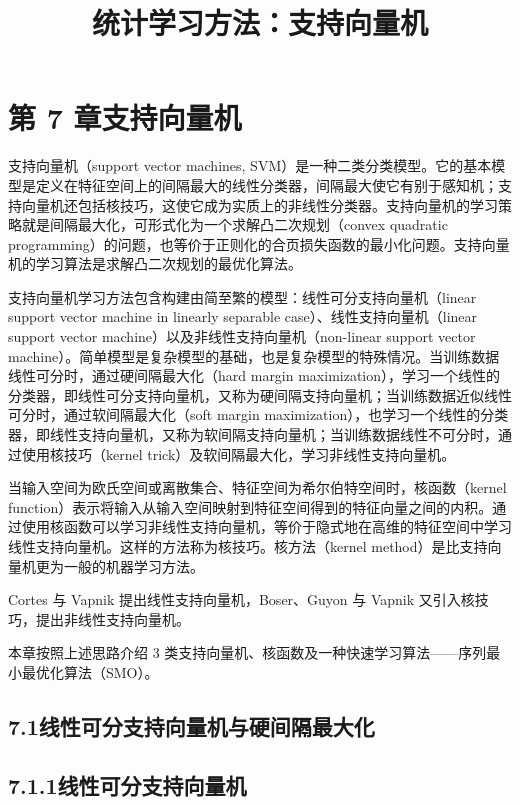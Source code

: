 \documentclass[UTF8, 12pt, fontset=fandol, oneside]{ctexart}
\title{统计学习方法：支持向量机}
\author{}
\date{}
\begin{document}
\maketitle

\section*{第 7 章\quad 支持向量机}

支持向量机（support vector machines, SVM）是一种二类分类模型。它的基本模型是定义在特征空间上的间隔最大的线性分类器，间隔最大使它有别于感知机；支持向量机还包括核技巧，这使它成为实质上的非线性分类器。支持向量机的学习策略就是间隔最大化，可形式化为一个求解凸二次规划（convex quadratic programming）的问题，也等价于正则化的合页损失函数的最小化问题。支持向量机的学习算法是求解凸二次规划的最优化算法。

支持向量机学习方法包含构建由简至繁的模型：线性可分支持向量机（linear support vector machine in linearly separable case）、线性支持向量机（linear support vector machine）以及非线性支持向量机（non-linear support vector machine）。简单模型是复杂模型的基础，也是复杂模型的特殊情况。当训练数据线性可分时，通过硬间隔最大化（hard margin maximization），学习一个线性的分类器，即线性可分支持向量机，又称为硬间隔支持向量机；当训练数据近似线性可分时，通过软间隔最大化（soft margin maximization），也学习一个线性的分类器，即线性支持向量机，又称为软间隔支持向量机；当训练数据线性不可分时，通过使用核技巧（kernel trick）及软间隔最大化，学习非线性支持向量机。

当输入空间为欧氏空间或离散集合、特征空间为希尔伯特空间时，核函数（kernel function）表示将输入从输入空间映射到特征空间得到的特征向量之间的内积。通过使用核函数可以学习非线性支持向量机，等价于隐式地在高维的特征空间中学习线性支持向量机。这样的方法称为核技巧。核方法（kernel method）是比支持向量机更为一般的机器学习方法。

Cortes 与 Vapnik 提出线性支持向量机，Boser、Guyon 与 Vapnik 又引入核技巧，提出非线性支持向量机。

本章按照上述思路介绍 3 类支持向量机、核函数及一种快速学习算法——序列最小最优化算法（SMO）。

\subsection*{7.1\quad 线性可分支持向量机与硬间隔最大化}

\subsection*{7.1.1\quad 线性可分支持向量机}
\end{document}
